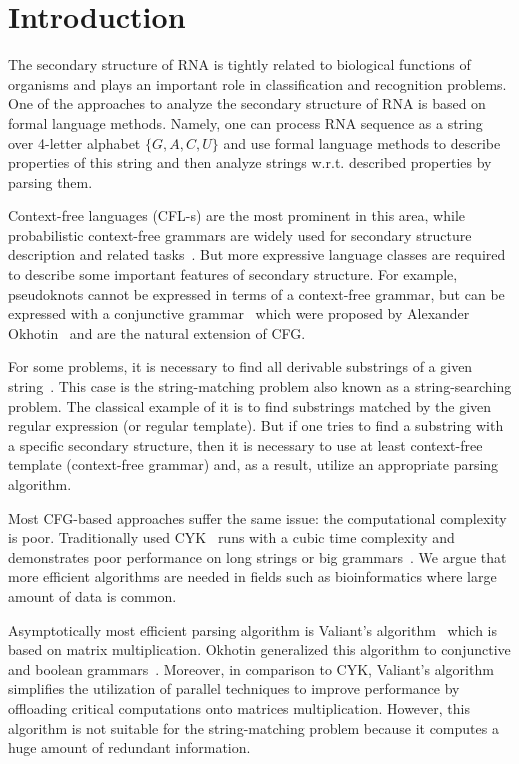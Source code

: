 \section{Introduction}

The secondary structure of RNA is tightly related to biological functions of organisms and plays an important role in classification and recognition problems.
One of the approaches to analyze the secondary structure of RNA is based on formal language methods.
Namely, one can process RNA sequence as a string over 4-letter alphabet $\{G,A,C,U\}$ and use formal language methods to describe properties of this string and then analyze strings w.r.t. described properties by parsing them. 

Context-free languages (CFL-s) are the most prominent in this area, while probabilistic context-free grammars are widely used for secondary structure description and related tasks~\cite{dowell2004evaluation,knudsen1999rna}.
But more expressive language classes are required to describe some important features of secondary structure. For example, pseudoknots cannot be expressed in terms of a context-free grammar, but can be expressed with a conjunctive grammar~\cite{zier2013rna} which were proposed by Alexander Okhotin~\cite{10.5555/543313.543323} and are the natural extension of CFG. 

For some problems, it is necessary to find all derivable substrings of a given string~\cite{durbin1996biological}.
This case is the string-matching problem also known as a string-searching problem.
The classical example of it is to find substrings matched by the given regular expression (or regular template). 
But if one tries to find a substring with a specific secondary structure, then it is necessary to use at least context-free template (context-free grammar) and, as a result, utilize an appropriate parsing algorithm. 

Most CFG-based approaches suffer the same issue: the computational complexity is poor.
Traditionally used CYK~\cite{kasami1966efficient,Younger:1966:CLP:1441427.1442019} runs with a cubic time complexity and demonstrates poor performance on long strings or big grammars~\cite{liu2005parallel}.
We argue that more efficient algorithms are needed in fields such as bioinformatics where large amount of data is common.

Asymptotically most efficient parsing algorithm is Valiant's algorithm~\cite{Valiant:1975:GCR:1739932.1740048} which is based on matrix multiplication.
Okhotin generalized this algorithm to conjunctive and boolean grammars~\cite{Okhotin:2014:PMM:2565359.2565379}. 
Moreover, in comparison to CYK, Valiant’s algorithm simplifies the utilization of parallel techniques to improve performance by offloading critical computations onto matrices multiplication.
However, this algorithm is not suitable for the string-matching problem because it computes a huge amount of redundant information.

